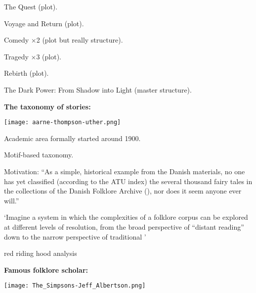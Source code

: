       The Quest (plot).
    
      Voyage and Return (plot).
    
      Comedy $\times$2 (plot but really structure).
    
      Tragedy $\times$3 (plot).
    
      Rebirth (plot).
    
      The Dark Power: From Shadow into Light (master structure).
  
  \textbf{The taxonomy of stories:}
    
\begin{marginfigure}
  \texttt{[image: aarne-thompson-uther.png]}
\end{marginfigure}
        
    \textbf{}
        Academic area formally started around 1900.
      
      
        Motif-based taxonomy.
      
  
  \footnotesize
    
      Motivation: ``As a simple, historical example from the Danish
      materials, no one has yet classified (according to the ATU index) the
      several thousand fairy tales in the collections of the Danish Folklore
      Archive (),
      nor does it seem anyone ever will.''
    
      `Imagine a system in which the complexities of a folklore corpus
      can be explored at different levels of resolution, from the broad
      perspective of ``distant reading'' down to the narrow perspective of
      traditional '


      red riding hood analysis
      \cite{tehrani2013a}


      
\textbf{Famous folklore scholar:}
      
      
\begin{marginfigure}
  \texttt{[image: The\_Simpsons-Jeff\_Albertson.png]}
\end{marginfigure}
      
